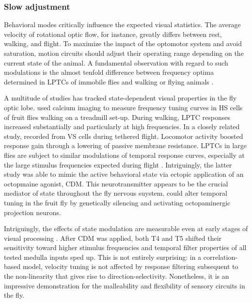 \subsubsection{Slow adjustment}
Behavioral modes critically influence the expected visual statistics. The average velocity of rotational optic flow, for instance, greatly differs between rest, walking, and flight. To maximize the impact of the optomotor system and avoid saturation, motion circuits should adjust their operating range depending on the current state of the animal. A fundamental observation with regard to such modulations is the almost tenfold difference between frequency optima determined in LPTCs of immobile flies and walking or flying animals \citep{Joesch:2008fo,Duistermars:2007aa}.

A multitude of studies has tracked state-dependent visual properties in the fly optic lobe. \citet{Chiappe:2010cl} used calcium imaging to measure frequency tuning curves in HS cells of fruit flies walking on a treadmill set-up. During walking, LPTC responses increased substantially and particularly at high frequencies. In a closely related study, \citet{Maimon:2010jy} recorded from VS cells during tethered flight. Locomotor activity boosted response gain through a lowering of passive membrane resistance. LPTCs in large flies are subject to similar modulations of temporal response curves, especially at the large stimulus frequencies expected during flight \citep{Jung:2011bc}. Intriguingly, the latter study was able to mimic the active behavioral state via ectopic application of an octopmaine agonist, CDM. This neurotransmitter appears to be the crucial mediator of state throughout the fly nervous suystem. \citet{Suver:2012bya} could alter temporal tuning in the fruit fly by genetically silencing and activating octopaminergic projection neurons.

Intriguingly, the effects of state modulation are measurable even at early stages of visual processing \citep{Arenz:2017aa}. After CDM was applied, both T4 and T5 shifted their sensitivity toward higher stimulus frequencies and temporal filter properties of all tested medulla inputs sped up. This is not entirely surprising: in a correlation-based model, velocity tuning is not affected by response filtering subsequent to the non-linearity that gives rise to direction-selectivity. Nonetheless, it is an impressive demonstration for the malleability and flexibility of sensory circuits in the fly.

